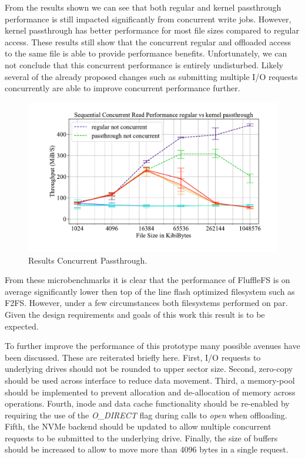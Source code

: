 \label{re1}

From the results shown we can see that both regular and kernel passthrough
performance is still impacted significantly from concurrent write jobs.
However, kernel passthrough has better performance for most file sizes compared
to regular access. These results still show that the concurrent regular and
offloaded access to the same file is able to provide performance benefits.
Unfortunately, we can not conclude that this concurrent performance is entirely
undisturbed. Likely several of the already proposed changes such as submitting
multiple I/O requests concurrently are able to improve concurrent performance
further.

\begin{figure}[h]
    \centering
	\includegraphics[width=1\textwidth]{resources/images/results-concurrent-read.pdf}
	\caption{Results Concurrent Passthrough.}
    \label{figure:concurrentpassthrough}
\end{figure}

From these microbenchmarks it is clear that the performance of FluffleFS is
on average significantly lower then top of the line flash optimized filesystem
such as F2FS. However, under a few circumstances both filesystems
performed on par. Given the design requirements and goals of this work this
result is to be expected.

To further improve the performance of this prototype many possible avenues have
been discussed. These are reiterated briefly here. First, I/O requests to
underlying drives  should not be rounded to upper sector size. Second, zero-copy
should be used across interface to reduce data movement. Third, a memory-pool
should be implemented to prevent allocation and de-allocation of memory across
operations. Fourth, inode and data cache functionality should be re-enabled by
requiring the use of the \textit{O\_DIRECT} flag during calls to \textit{open}
when offloading. Fifth, the NVMe backend should be updated to allow multiple
concurrent requests to be submitted to the underlying drive. Finally, the
size of buffers should be increased to allow to move more than 4096 bytes in a
single request.

